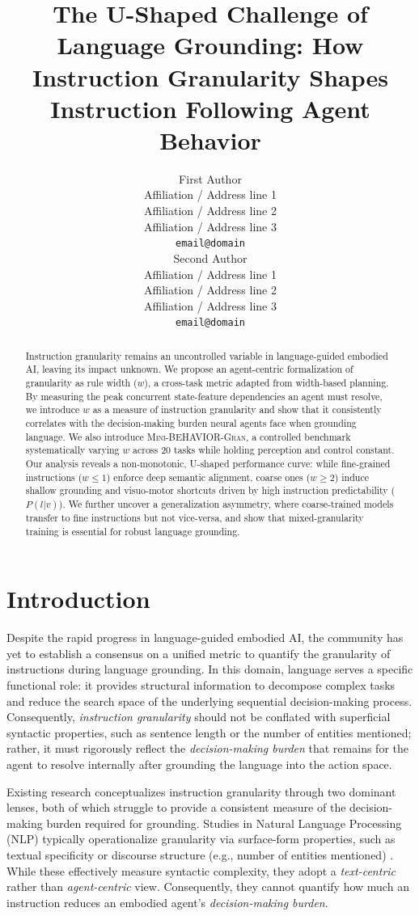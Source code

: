\documentclass[11pt]{article}
\title{The U-Shaped Challenge of Language Grounding: How Instruction Granularity Shapes Instruction Following Agent Behavior}
\author{First Author \\
  Affiliation / Address line 1 \\
  Affiliation / Address line 2 \\
  Affiliation / Address line 3 \\
  \texttt{email@domain} \\\And
  Second Author \\
  Affiliation / Address line 1 \\
  Affiliation / Address line 2 \\
  Affiliation / Address line 3 \\
  \texttt{email@domain} \\}
\begin{document}
\maketitle
\begin{abstract}
Instruction granularity remains an uncontrolled variable in language-guided embodied AI, leaving its impact unknown. We propose an agent-centric formalization of granularity as rule width ($w$), a cross-task metric adapted from width-based planning. By measuring the peak concurrent state-feature dependencies an agent must resolve, we introduce $w$ as a measure of instruction granularity and show that it consistently correlates with the decision-making burden neural agents face when grounding language. We also introduce \textsc{Mini-BEHAVIOR-Gran}, a controlled benchmark systematically varying $w$ across 20 tasks while holding perception and control constant. Our analysis reveals a non-monotonic, U-shaped performance curve: while fine-grained instructions ($w \le 1$) enforce deep semantic alignment, coarse ones ($w \ge 2$) induce shallow grounding and visuo-motor shortcuts driven by high instruction predictability ($P(l|v)$). We further uncover a generalization asymmetry, where coarse-trained models transfer to fine instructions but not vice-versa, and show that mixed-granularity training is essential for robust language grounding. 
\end{abstract}

\section{Introduction}
\label{sec:introduction}

Despite the rapid progress in language-guided embodied AI, the community has yet to establish a consensus on a unified metric to quantify the granularity of instructions during language grounding. In this domain, language serves a specific functional role: it provides structural information to decompose complex tasks and reduce the search space of the underlying sequential decision-making process. Consequently, \emph{instruction granularity} should not be conflated with superficial syntactic properties, such as sentence length or the number of entities mentioned; rather, it must rigorously reflect the \emph{decision-making burden} that remains for the agent to resolve internally after grounding the language into the action space.

Existing research conceptualizes instruction granularity through two dominant lenses, both of which struggle to provide a consistent measure of the decision-making burden required for grounding.
Studies in Natural Language Processing (NLP) typically operationalize granularity via surface-form properties, such as textual specificity or discourse structure (e.g., number of entities mentioned) \citep{dong-lapata-2018-coarse,huang-etal-2025-musc}. While these effectively measure syntactic complexity, they adopt a \emph{text-centric} rather than \emph{agent-centric} view. Consequently, they cannot quantify how much an instruction reduces an embodied agent's \emph{decision-making burden}.
\end{document}
